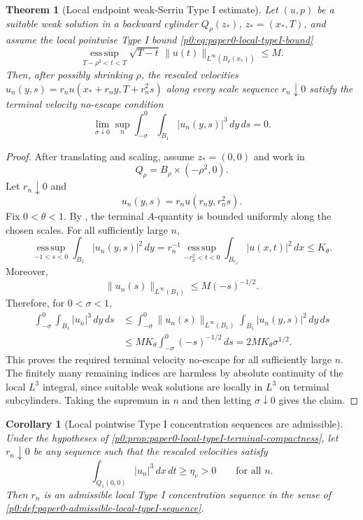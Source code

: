 \documentclass[11pt]{amsart}
\theoremstyle{plain}
\newtheorem{theorem}{Theorem}[section]
\newtheorem{corollary}[corollary]{Corollary}
\theoremstyle{definition}
\theoremstyle{remark}
\numberwithin{equation}{section}
\newcommand{\esssup}{\operatorname*{ess\,sup}}
\begin{document}
\begin{theorem}[Local endpoint weak-Serrin Type I estimate]
\label{p0:thm:local-weak-serrin-typeI}
Let \((u,p)\) be a suitable weak solution in a backward cylinder
\(Q_\rho(z_*)\), \(z_*=(x_*,T)\), and assume the local pointwise Type I bound
\eqref{p0:eq:paper0-local-typeI-bound}
\[
  \esssup_{T-\rho^2<t<T}
  \sqrt{T-t}\,\|u(t)\|_{L^\infty(B_\rho(x_*))}\le M.
\]
Then, after possibly shrinking \(\rho\), the rescaled velocities
\(u_n(y,s)=r_nu(x_*+r_ny,T+r_n^2s)\) along every scale sequence
\(r_n\downarrow0\) satisfy the terminal velocity no-escape condition
\[
   \lim_{\sigma\downarrow0}\sup_n
   \int_{-\sigma}^{0}\int_{B_1}|u_n(y,s)|^3\,dy\,ds=0 .
\]
\end{theorem}

\begin{proof}
After translating and scaling, assume \(z_*=(0,0)\) and work in
\[
   Q_\rho=B_\rho\times(-\rho^2,0).
\]
Let \(r_n\downarrow0\) and
\[
   u_n(y,s)=r_n u(r_ny,r_n^2s).
\]
Fix \(0<\theta<1\).  By , the terminal
\(A\)-quantity is bounded uniformly along the chosen scales.
For all sufficiently large \(n\),
\[
   \esssup_{-1<s<0}\int_{B_1}|u_n(y,s)|^2\,dy
   =
   r_n^{-1}\esssup_{-r_n^2<t<0}
   \int_{B_{r_n}}|u(x,t)|^2\,dx
   \le K_\theta .
\]
Moreover,
\[
   \|u_n(s)\|_{L^\infty(B_1)}
   \le M(-s)^{-1/2}.
\]
Therefore, for \(0<\sigma<1\),
\[
\begin{aligned}
   \int_{-\sigma}^{0}\int_{B_1}|u_n|^3\,dy\,ds
   &\le
   \int_{-\sigma}^{0}
   \|u_n(s)\|_{L^\infty(B_1)}
   \int_{B_1}|u_n(y,s)|^2\,dy\,ds  \\
   &\le
   M K_\theta \int_{-\sigma}^{0}(-s)^{-1/2}\,ds
   =
   2M K_\theta\sigma^{1/2}.
\end{aligned}
\]
This proves the required terminal velocity no-escape for all sufficiently
large \(n\).  The finitely many remaining indices are harmless by absolute
continuity of the local \(L^3\) integral, since suitable weak solutions are
locally in \(L^3\) on terminal subcylinders.  Taking the
supremum in \(n\) and then letting \(\sigma\downarrow0\) gives the claim.
\end{proof}

\begin{corollary}[Local pointwise Type I concentration sequences are admissible]
\label{p0:cor:paper0-local-typeI-admissible}
Under the hypotheses of
\cref{p0:prop:paper0-local-typeI-terminal-compactness}, let \(r_n\downarrow0\) be
any sequence such that the rescaled velocities satisfy
\[
  \int_{Q_1(0,0)} |u_n|^3\,dx\,dt\ge\eta_v>0
  \qquad\text{for all }n .
\]
Then \(r_n\) is an admissible local Type I concentration sequence in the sense of
\cref{p0:def:paper0-admissible-local-typeI-sequence}.
\end{corollary}
\end{document}
